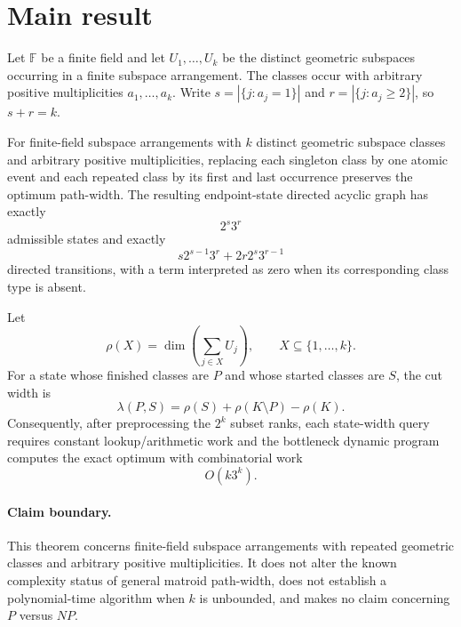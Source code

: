 \section{Main result}

Let $\mathbb F$ be a finite field and let $U_1,\ldots,U_k$ be the distinct geometric subspaces occurring in a finite subspace arrangement.  The classes occur with arbitrary positive multiplicities $a_1,\ldots,a_k$.  Write $s=|\{j:a_j=1\}|$ and $r=|\{j:a_j\ge 2\}|$, so $s+r=k$.

\begin{theorem}
For finite-field subspace arrangements with $k$ distinct geometric subspace classes and arbitrary positive multiplicities, replacing each singleton class by one atomic event and each repeated class by its first and last occurrence preserves the optimum path-width.  The resulting endpoint-state directed acyclic graph has exactly
\[
  2^s3^r
\]
admissible states and exactly
\[
  s2^{s-1}3^r+2r2^s3^{r-1}
\]
directed transitions, with a term interpreted as zero when its corresponding class type is absent.

Let
\[
  \rho(X)=\dim\!\left(\sum_{j\in X}U_j\right),\qquad X\subseteq\{1,\ldots,k\}.
\]
For a state whose finished classes are $P$ and whose started classes are $S$, the cut width is
\[
  \lambda(P,S)=\rho(S)+\rho(K\setminus P)-\rho(K).
\]
Consequently, after preprocessing the $2^k$ subset ranks, each state-width query requires constant lookup/arithmetic work and the bottleneck dynamic program computes the exact optimum with combinatorial work
\[
  O(k3^k).
\]
\end{theorem}

\paragraph{Claim boundary.}
This theorem concerns finite-field subspace arrangements with repeated geometric classes and arbitrary positive multiplicities.  It does not alter the known complexity status of general matroid path-width, does not establish a polynomial-time algorithm when $k$ is unbounded, and makes no claim concerning $P$ versus $NP$.
